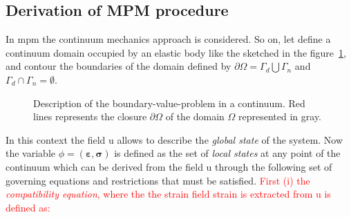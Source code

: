 \documentclass[preprint,12pt,a4paper]{elsarticle}
\newcommand{\tens}[1]{
  \ensuremath{\mathbf{{#1}}}
}
\newcommand{\PNA}[1]{
  \textcolor{red}{{#1}}
}
\begin{document}
\subsection{Derivation of MPM procedure}
\label{sec:derivation-mpm}

In \acrshort{mpm} the continuum mechanics approach is considered. So on, let
define a continuum \gls{domain}  occupied by an elastic body like
the sketched in the figure~\ref{fig:Continuum-solid}, and \gls{contour} the boundaries of the domain defined by $\partial \varOmega
= \Gamma_d \bigcup \Gamma_n$ and $\Gamma_d \cap  \Gamma_n = \emptyset$.
\begin{figure}\sidecaption
  \centering
  \caption{Description of the boundary-value-problem in a
    continuum. Red lines represents the closure $\partial \varOmega$
    of the domain $\varOmega$ represented in gray.}
  \label{fig:Continuum-solid}
\end{figure}
In this context the field \gls{u} allows to describe the \textit{global state}
of the system. Now the variable $\phi =
(\tens{\varepsilon},\tens{\sigma})$ is defined as the set of \textit{local
  states} at any point of the continuum which can be derived from the
field \gls{u} through the following set of governing equations and
restrictions that must be satisfied.\PNA{First (i) the \textit{compatibility
  equation}, where the the strain field \gls{strain} is extracted from \gls{u} is defined as:}
\end{document}
